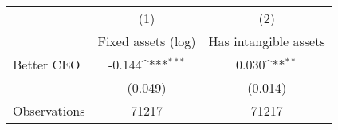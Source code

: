 {
\def\sym#1{\ifmmode^{#1}\else\(^{#1}\)\fi}
\begin{tabular}{l*{2}{c}}
\hline\hline
                    &\multicolumn{1}{c}{(1)}&\multicolumn{1}{c}{(2)}\\
                    &\multicolumn{1}{c}{Fixed assets (log)}&\multicolumn{1}{c}{Has intangible assets}\\
\hline
Better CEO          &      -0.144\sym{***}&       0.030\sym{**} \\
                    &     (0.049)         &     (0.014)         \\
\hline
Observations        &       71217         &       71217         \\
\hline\hline
\end{tabular}
}

